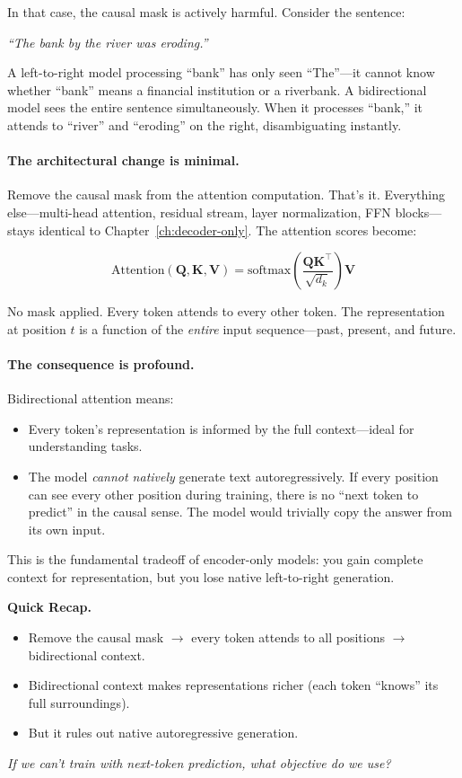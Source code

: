 In that case, the causal mask is actively harmful. Consider the sentence:

\begin{center}
\textit{``The bank by the river was eroding.''}
\end{center}

A left-to-right model processing ``bank'' has only seen ``The''---it cannot know whether ``bank'' means a financial institution or a riverbank. A bidirectional model sees the entire sentence simultaneously. When it processes ``bank,'' it attends to ``river'' and ``eroding'' on the right, disambiguating instantly.

\paragraph{The architectural change is minimal.} Remove the causal mask from the attention computation. That's it. Everything else---multi-head attention, residual stream, layer normalization, FFN blocks---stays identical to Chapter~\ref{ch:decoder-only}. The attention scores become:

\[
  \text{Attention}(\mathbf{Q}, \mathbf{K}, \mathbf{V}) = \text{softmax}\!\left(\frac{\mathbf{Q}\mathbf{K}^\top}{\sqrt{d_k}}\right)\mathbf{V}
\]

No mask applied. Every token attends to every other token. The representation at position $t$ is a function of the \emph{entire} input sequence---past, present, and future.

\paragraph{The consequence is profound.} Bidirectional attention means:
\begin{itemize}[nosep]
  \item Every token's representation is informed by the full context---ideal for understanding tasks.
  \item The model \emph{cannot natively} generate text autoregressively. If every position can see every other position during training, there is no ``next token to predict'' in the causal sense. The model would trivially copy the answer from its own input.
\end{itemize}

This is the fundamental tradeoff of encoder-only models: you gain complete context for representation, but you lose native left-to-right generation.

\begin{quickrecap}
\textbf{Quick Recap.}
\begin{itemize}[nosep,leftmargin=1.5em]
  \item Remove the causal mask $\to$ every token attends to all positions $\to$ bidirectional context.
  \item Bidirectional context makes representations richer (each token ``knows'' its full surroundings).
  \item But it rules out native autoregressive generation.
\end{itemize}
\textit{If we can't train with next-token prediction, what objective do we use?}
\end{quickrecap}

